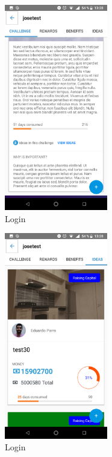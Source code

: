 \begin{figure}[!h]
	\begin{center}
		\includegraphics[width=0.4\textwidth]{./img/anexo1/ver_desafio_inicio_cont.png}
		\caption{Login}
		\label{fig:ver_desafio_inicio_cont}
	\end{center}
\end{figure}

\begin{figure}[!h]
	\begin{center}
		\includegraphics[width=0.4\textwidth]{./img/anexo1/ver_desafio_ideas.png}
		\caption{Login}
		\label{fig:ver_desafio_inicio_ideas}
	\end{center}
\end{figure}

